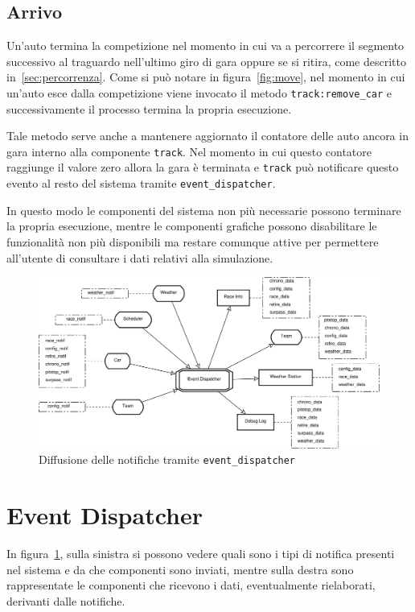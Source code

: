 \documentclass[a4paper]{report}
\newcommand{\fun}[1]{\texttt{#1}}
\begin{document}
\subsection{Arrivo}
Un'auto termina la competizione nel momento in cui va a percorrere il segmento successivo al traguardo nell'ultimo giro di gara oppure se si ritira, come descritto in~\ref{sec:percorrenza}. Come si può notare in figura~\ref{fig:move}, nel momento in cui un'auto esce dalla competizione viene invocato il metodo \fun{track:remove\_car} e successivamente il processo termina la propria esecuzione.

Tale metodo serve anche a mantenere aggiornato il contatore delle auto ancora in gara interno alla componente \texttt{track}. Nel momento in cui questo contatore raggiunge il valore zero allora la gara è terminata e \texttt{track} può notificare questo evento al resto del sistema tramite \texttt{event\_dispatcher}.

In questo modo le componenti del sistema non più necessarie possono terminare la propria esecuzione, mentre le componenti grafiche possono disabilitare le funzionalità non più disponibili ma restare comunque attive per permettere all'utente di consultare i dati relativi alla simulazione.

\begin{landscape}
\begin{figure}
\includegraphics[width=0.75\paperheight]{diagrammi/NotifFlow}
\caption{Diffusione delle notifiche tramite \texttt{event\_dispatcher}}
\label{fig:notifFlow}
\end{figure}
\end{landscape}

\section{Event Dispatcher}
\label{sec:event_dispatcher}
In figura~\ref{fig:notifFlow}, sulla sinistra si possono vedere quali sono i tipi di notifica presenti nel sistema e da che componenti sono inviati, mentre sulla destra sono rappresentate le componenti che ricevono i dati, eventualmente rielaborati, derivanti dalle notifiche.
\end{document}
